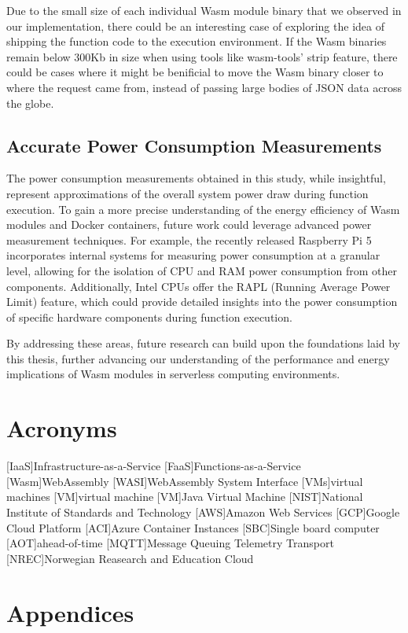\documentclass[
  table]{report}
\begin{document}
Due to the small size of each individual \ac{Wasm} module binary that we
observed in our implementation, there could be an interesting case of
exploring the idea of shipping the function code to the execution
environment. If the \ac{Wasm} binaries remain below 300Kb in size when
using tools like wasm-tools' strip feature, there could be cases where
it might be benificial to move the \ac{Wasm} binary closer to where the
request came from, instead of passing large bodies of JSON data across
the globe.

\section{Accurate Power Consumption Measurements}

The power consumption measurements obtained in this study, while
insightful, represent approximations of the overall system power draw
during function execution. To gain a more precise understanding of the
energy efficiency of Wasm modules and Docker containers, future work
could leverage advanced power measurement techniques. For example, the
recently released Raspberry Pi 5 incorporates internal systems for
measuring power consumption at a granular level, allowing for the
isolation of CPU and RAM power consumption from other components.
Additionally, Intel CPUs offer the RAPL (Running Average Power Limit)
feature, which could provide detailed insights into the power
consumption of specific hardware components during function execution.

By addressing these areas, future research can build upon the
foundations laid by this thesis, further advancing our understanding of
the performance and energy implications of Wasm modules in serverless
computing environments.

\chapter*{Acronyms}
\begin{acronym}
  [IaaS]{Infrastructure-as-a-Service}
  [FaaS]{Functions-as-a-Service}
  [Wasm]{WebAssembly}
  [WASI]{WebAssembly System Interface}
  [VMs]{virtual machines}
  [VM]{virtual machine}
  [VM]{Java Virtual Machine}
  [NIST]{National Institute of Standards and Technology}
  [AWS]{Amazon Web Services}
  [GCP]{Google Cloud Platform}
  [ACI]{Azure Container Instances}
  [SBC]{Single board computer}
  [AOT]{ahead-of-time}
  [MQTT]{Message Queuing Telemetry Transport}
  [NREC]{Norwegian Reasearch and Education Cloud}
\end{acronym}

\chapter*{Appendices}

\printbibliography
\end{document}
